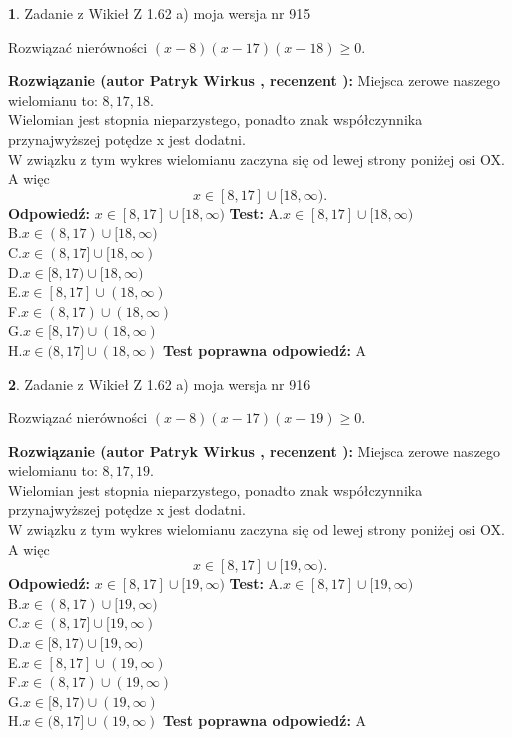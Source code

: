 \documentclass[12pt, a4paper]{article}
\theoremstyle{definition} %
\newtheorem{zad}{}
\newcommand{\zadStart}[1]{\begin{zad}#1\newline}
\newcommand{\zadStop}{\end{zad}}
\newcommand{\rozwStart}[2]{\noindent \textbf{Rozwiązanie (autor #1 , recenzent #2): }\newline}
\newcommand{\rozwStop}{\newline}
\newcommand{\odpStart}{\noindent \textbf{Odpowiedź:}\newline}
\newcommand{\odpStop}{\newline}
\newcommand{\testStart}{\noindent \textbf{Test:}\newline}
\newcommand{\testStop}{\newline}
\newcommand{\kluczStart}{\noindent \textbf{Test poprawna odpowiedź:}\newline}
\newcommand{\kluczStop}{\newline}
\begin{document}
\zadStart{Zadanie z Wikieł Z 1.62 a) moja wersja nr 915}

Rozwiązać nierówności $(x-8)(x-17)(x-18)\ge0$.
\zadStop
\rozwStart{Patryk Wirkus}{}
Miejsca zerowe naszego wielomianu to: $8, 17, 18$.\\
Wielomian jest stopnia nieparzystego, ponadto znak współczynnika przy\linebreak najwyższej potędze x jest dodatni.\\ W związku z tym wykres wielomianu zaczyna się od lewej strony poniżej osi OX. A więc $$x \in [8,17] \cup [18,\infty).$$
\rozwStop
\odpStart
$x \in [8,17] \cup [18,\infty)$
\odpStop
\testStart
A.$x \in [8,17] \cup [18,\infty)$\\
B.$x \in (8,17) \cup [18,\infty)$\\
C.$x \in (8,17] \cup [18,\infty)$\\
D.$x \in [8,17) \cup [18,\infty)$\\
E.$x \in [8,17] \cup (18,\infty)$\\
F.$x \in (8,17) \cup (18,\infty)$\\
G.$x \in [8,17) \cup (18,\infty)$\\
H.$x \in (8,17] \cup (18,\infty)$
\testStop
\kluczStart
A
\kluczStop



\zadStart{Zadanie z Wikieł Z 1.62 a) moja wersja nr 916}

Rozwiązać nierówności $(x-8)(x-17)(x-19)\ge0$.
\zadStop
\rozwStart{Patryk Wirkus}{}
Miejsca zerowe naszego wielomianu to: $8, 17, 19$.\\
Wielomian jest stopnia nieparzystego, ponadto znak współczynnika przy\linebreak najwyższej potędze x jest dodatni.\\ W związku z tym wykres wielomianu zaczyna się od lewej strony poniżej osi OX. A więc $$x \in [8,17] \cup [19,\infty).$$
\rozwStop
\odpStart
$x \in [8,17] \cup [19,\infty)$
\odpStop
\testStart
A.$x \in [8,17] \cup [19,\infty)$\\
B.$x \in (8,17) \cup [19,\infty)$\\
C.$x \in (8,17] \cup [19,\infty)$\\
D.$x \in [8,17) \cup [19,\infty)$\\
E.$x \in [8,17] \cup (19,\infty)$\\
F.$x \in (8,17) \cup (19,\infty)$\\
G.$x \in [8,17) \cup (19,\infty)$\\
H.$x \in (8,17] \cup (19,\infty)$
\testStop
\kluczStart
A
\kluczStop
\end{document}
